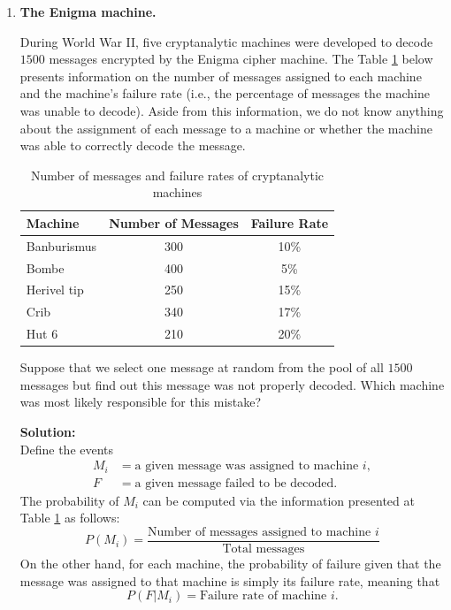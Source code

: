 \documentclass[12pt]{article}
\newif\ifsolutions
\begin{document}
\begin{enumerate}
    \item \textbf{The Enigma machine.}
    
    During World War II, five cryptanalytic machines were developed to decode $1500$ messages encrypted by the Enigma cipher machine. The Table \ref{tb:enigma} below presents information on the number of messages assigned to each machine and the machine’s failure rate (i.e., the percentage of messages the machine was unable to decode). Aside from this information, we do not know anything about the assignment of each message to a machine or whether the machine was able to correctly decode the message.

    \begin{table}[ht!]
        \centering
        \begin{tabular}{lcc}
            \toprule
            \textbf{Machine} & \textbf{Number of Messages} & \textbf{Failure Rate} \\
            \midrule
            Banburismus & 300 & 10\% \\
            Bombe & 400 & 5\% \\
            Herivel tip & 250 & 15\% \\
            Crib & 340 & 17\% \\
            Hut 6 & 210 & 20\% \\
            \bottomrule
        \end{tabular}
        \caption{Number of messages and failure rates of cryptanalytic machines}
        \label{tb:enigma}
    \end{table}
    
    Suppose that we select one message at random from the pool of all $1500$ messages but find out this message was not properly decoded. Which machine was most likely responsible for this mistake?
    
    \ifsolutions \color{blue} \textbf{Solution:} \\
    Define the events
    \begin{align*}
        M_i &= \text{a given message was assigned to machine } i, \\    
        F &= \text{a given message failed to be decoded}.
    \end{align*}
    The probability of $M_i$ can be computed via the information presented at Table \ref{tb:enigma} as follows:
    \[
    P(M_i) = \frac{\text{Number of messages assigned to machine } i}{\text{Total messages}}
    \]
    On the other hand, for each machine, the probability of failure given that the message was assigned to that machine is simply its failure rate, meaning that %
    \[
    P(F | M_i) = \text{Failure rate of machine } i.
    \]
    

\end{enumerate}
\end{document}
